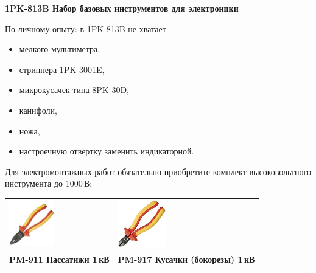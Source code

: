 \textbf{1PK-813B Набор базовых инструментов для электроники}

\clearpage

По личному опыту: в 1PK-813B не хватает

\begin{itemize}
  \item мелкого мультиметра,
  \item стриппера 1PK-3001E,
  \item микрокусачек типа 8PK-30D,
  \item канифоли,
  \item ножа,
  \item настроечную отвертку заменить индикаторной.
\end{itemize}

\clearpage
{}

Для электромонтажных работ обязательно приобретите комплект
высоковольтного инструмента до 1000\,В:

\begin{tabular}{p{} p{}}
\noindent\includegraphics[width=0.45\textwidth]{tech/tools/proskit/PM-911.jpg}
&
\noindent\includegraphics[width=0.35\textwidth]{tech/tools/proskit/PM-917.jpg}
\\

\textbf{PM-911 Пассатижи 1\,кВ}
&
\textbf{PM-917 Кусачки (бокорезы) 1\,кВ}
\\
\end{tabular}
\clearpage

